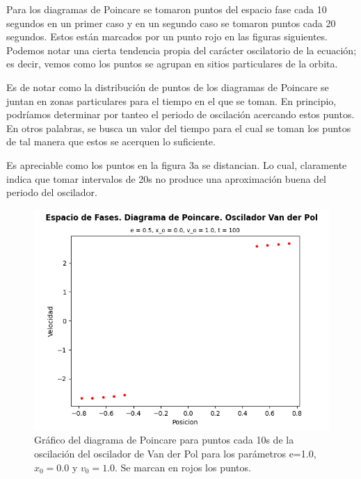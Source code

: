 \documentclass{article}
\begin{document}
	Para los diagramas de Poincare se tomaron puntos del espacio fase cada 10 segundos en un primer caso y en un segundo caso se tomaron puntos cada 20 segundos. Estos est\'an marcados por un punto rojo en las figuras siguientes. Podemos notar una cierta tendencia propia del car\'acter oscilatorio de la ecuaci\'on; es decir, vemos como los puntos se agrupan en sitios particulares de la orbita.\newline
	
	Es de notar como la distribuci\'on de puntos de los diagramas de Poincare se juntan en zonas particulares para el tiempo en el que se toman. En principio, podríamos determinar por tanteo el periodo de oscilación acercando estos puntos. En otros palabras, se busca un valor del tiempo para el cual se toman los puntos de tal manera que estos se acerquen lo suficiente.\newline
	
	Es apreciable como los puntos en la figura 3a se distancian. Lo cual, claramente indica que tomar intervalos de 20s no produce una aproximación buena del periodo del oscilador.
	
	\begin{figure}[h!]
		\centering
		\ContinuedFloat*
		\includegraphics[width=0.8\linewidth]{DIAGRAMA DE POINCARE 1}
		\caption{Gr\'afico del diagrama de Poincare para puntos cada 10s de la oscilaci\'on del oscilador de Van der Pol para los par\'ametros e=1.0, $x_0=0.0$ y $v_0=1.0$. Se marcan en rojos los puntos.}
	\end{figure}
	
\end{document}

